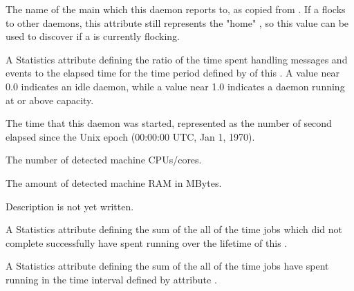 \begin{description}

\item[\AdAttr{CollectorHost}:] The name of the main 
  which this  daemon reports to,
  as copied from .  
  If a  flocks to other  daemons,
  this attribute still represents the "home" ,
  so this value can be used to discover if a  
  is currently flocking.

\item[\AdAttr{DaemonCoreDutyCycle}:] A Statistics attribute defining
  the ratio of the time spent handling 
  messages and events to the elapsed time for the time period defined by
   of this .
  A value near 0.0 indicates an idle daemon, 
  while a value near 1.0 indicates a daemon running at or above capacity.

\item[\AdAttr{DaemonStartTime}:] The time that this daemon was
  started, represented as the number of second elapsed since
    the Unix epoch (00:00:00 UTC, Jan 1, 1970).

\item[\AdAttr{DetectedCpus}:] The number of detected machine CPUs/cores.

\item[\AdAttr{DetectedMemory}:] The amount of detected machine RAM in MBytes.

\item[\AdAttr{JobQueueBirthdate}:] Description is not yet written.

\item[\AdAttr{JobsAccumBadputTime}:] A Statistics attribute defining
  the sum of the all of the time jobs which did not complete successfully 
  have spent running over the lifetime of this .

\item[\AdAttr{JobsAccumRunningTime}:]  A Statistics attribute defining
  the sum of the all of the time jobs have spent running
  in the time interval defined by attribute .


\end{description}

